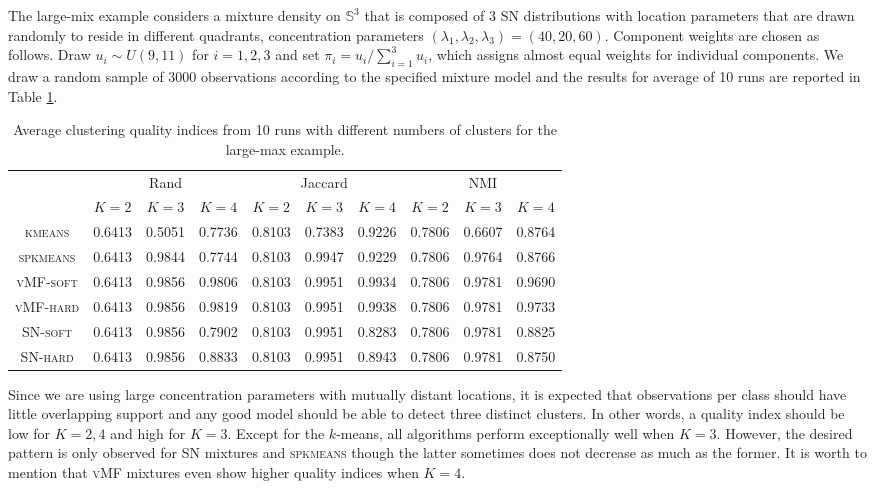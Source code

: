 \documentclass[11pt]{article}
\newcommand{\bbS}{\mathbb{S}}
\begin{document}
The \textsf{large-mix} example considers a mixture density on $\bbS^3$ that is composed of 3 SN distributions with location parameters that are drawn randomly to reside in different quadrants, concentration parameters  $(\lambda_1,\lambda_2,\lambda_3)=(40,20,60)$. Component weights are chosen as follows. Draw $u_i \sim U(9,11)$ for $i=1,2,3$ and set $\pi_i = u_i / \sum_{i=1}^3 u_i$, which assigns almost equal weights for individual components. We draw a random sample of 3000 observations according to the specified mixture model and the results for average of 10 runs are reported in Table \ref{table:large_mix}. 
\begin{table}[ht]
	\begin{center}
		\begin{tabular}{|c|c|c|c|c|c|c|c|c|c|}
			\hline
			\multirow{2}{*}{} & \multicolumn{3}{c|}{Rand} & \multicolumn{3}{c|}{Jaccard} & \multicolumn{3}{c|}{NMI} \\ \cline{2-10} 
			& $K=2$     & $K=3$    & $K=4$    & $K=2$      & $K=3$     & $K=4$     & $K=2$   & $K=3$   & $K=4$    \\ \hline
			\textsc{kmeans} & 0.6413 & 0.5051 & 0.7736 & 0.8103 & 0.7383 & 0.9226 & 0.7806 & 0.6607 & 0.8764 \\ \hline
			\textsc{spkmeans} & 0.6413 & 0.9844 & 0.7744 & 0.8103 & 0.9947 & 0.9229 & 0.7806 & 0.9764 & 0.8766 \\ \hline
			\textsc{vMF-soft} & 0.6413 & 0.9856 & 0.9806 & 0.8103 & 0.9951 & 0.9934 & 0.7806 & 0.9781 & 0.9690 \\ \hline
			\textsc{vMF-hard} & 0.6413 & 0.9856 & 0.9819 & 0.8103 & 0.9951 & 0.9938 & 0.7806 & 0.9781 & 0.9733 \\ \hline
			\textsc{SN-soft} & 0.6413 & 0.9856 & 0.7902 & 0.8103 & 0.9951 & 0.8283 & 0.7806 & 0.9781 & 0.8825 \\ \hline
			\textsc{SN-hard} & 0.6413 & 0.9856 & 0.8833 & 0.8103 & 0.9951 & 0.8943 & 0.7806 & 0.9781 & 0.8750 \\ \hline
		\end{tabular}
	\end{center}
	\caption{Average clustering quality indices from 10 runs with different numbers of clusters for the \textsf{large-max} example.}
	\label{table:large_mix}
\end{table}
Since we are using large concentration parameters with mutually distant locations, it is expected that observations per class should have little overlapping support and any good model should be able to detect three distinct clusters. In other words, a quality index should be low for $K=2,4$ and high for $K=3$. Except for the $k$-means, all algorithms perform exceptionally well when $K=3$. However, the desired pattern is only observed for \textsc{SN} mixtures and \textsc{spkmeans} though the latter sometimes does not decrease as much as the former. It is worth to mention that  \textsc{vMF} mixtures even show higher quality indices when $K=4$. 
\end{document}
